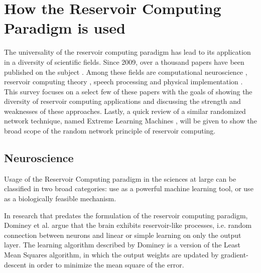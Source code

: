 \documentclass[12pt,oneside]{CUNY_CS_PhD}
\begin{document}
\chapter{How the Reservoir Computing Paradigm is used}
\label{lit}
The universality of the reservoir computing paradigm has lead to its application in a diversity of scientific fields. Since 2009, over a thousand papers have been published on the subject \cite{GS2014}. Among these fields are computational neuroscience \cite{buteneers2009real, bernacchia_reservoir_2011, hinaut_2012, hinaut_exploring_2014}, reservoir computing theory \cite{lukovsevivcius2012reservoir, hermans2012recurrent, chatzis2011echo, oubbati_multiobjective_2012}, speech processing \cite{triefenbach_phoneme_2010,JaDmMjp2013,JaTfDkMjp14} and physical implementation \cite{appeltant2011information, paquot2012optoelectronic, appeltant2014constructing}.
This survey focuses on a select few of these papers with the goals of showing the diversity of reservoir computing applications and discussing the strength and weaknesses of these approaches. 
Lastly, a quick review of a similar randomized network technique, named Extreme Learning Machines \cite{huang_extreme_2006,huang_extreme_2011}, will be given to show the broad scope of the random network principle of reservoir computing.

\section{Neuroscience}
Usage of the Reservoir Computing paradigm in the sciences at large can be classified in two broad categories: use as a powerful machine learning tool, or use as a biologically feasible mechanism. 

\label{dominey}
In research that predates the formulation of the reservoir computing paradigm, Dominey  et al. \cite{Dominey95, Domineyetal03} argue that the brain exhibits reservoir-like processes, i.e. random connection between neurons and linear or simple learning on only the output layer. The learning algorithm described by Dominey is a version of the Least Mean Squares algorithm, in which the output weights are updated by gradient-descent in order to minimize the mean square of the error.
\end{document}
